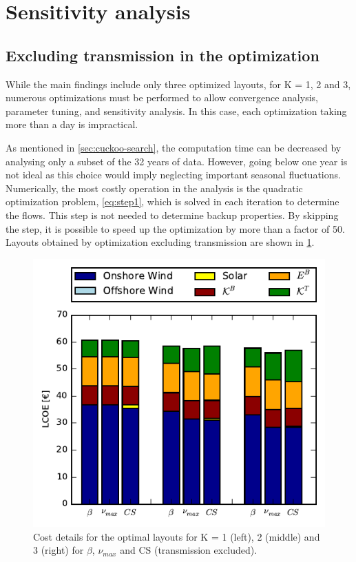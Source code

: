 \documentclass[a4paper, 5p, sort&compress]{elsarticle}%
\begin{document}
\section{Sensitivity analysis}
\label{sec:sensitivity-analysis}

\subsection{Excluding transmission in the optimization}
\label{sec:incl-transm-optim}

While the main findings include only three optimized layouts, for K =
1, 2 and 3, numerous optimizations must be performed to allow
convergence analysis, parameter tuning, and sensitivity analysis. In
this case, each optimization taking more than a day is impractical. 

As mentioned in \cref{sec:cuckoo-search}, the computation time can be
decreased by analysing only a subset of the 32 years of data. However,
going below one year is not ideal as this choice would imply
neglecting important seasonal fluctuations. Numerically, the most
costly operation in the analysis is the quadratic optimization problem,
\cref{eq:step1}, which is solved in each iteration to determine the
flows. This step is not needed to determine backup properties. By
skipping the step, it is possible to speed up the optimization by more
than a factor of 50. Layouts obtained by optimization excluding
transmission are shown in \cref{fig:cost-no-transmission}.

\begin{figure}[h!]
  \centering
  \includegraphics[width = \columnwidth]{costTransVE50}
  \caption{Cost details for the optimal layouts for K = 1 (left), 2
    (middle) and 3 (right) for $\beta$, $\nu_{max}$ and CS (transmission excluded).}
  \label{fig:cost-no-transmission}
\end{figure}
\end{document}
